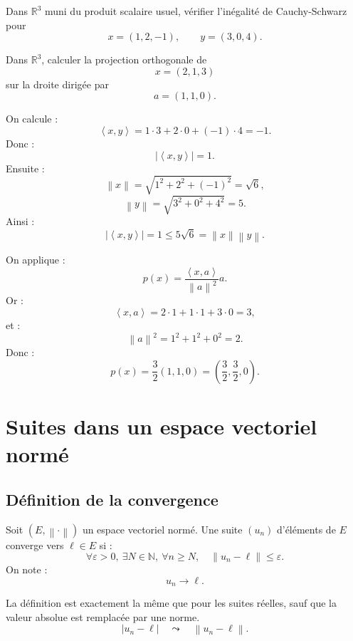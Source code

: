 \documentclass[11pt,a4paper]{article}
\newcommand{\R}{\mathbb R}
\newcommand{\N}{\mathbb N}
\newcommand{\norme}[1]{\left\lVert #1 \right\rVert}
\newcommand{\scal}[2]{\left\langle #1,#2\right\rangle}
\begin{document}
\begin{exercicebox}
Dans \(\R^3\) muni du produit scalaire usuel, vérifier l'inégalité de Cauchy-Schwarz pour
\[
x=(1,2,-1),\qquad y=(3,0,4).
\]
\end{exercicebox}

\begin{exercicebox}[5 -- Projection]
Dans \(\R^3\), calculer la projection orthogonale de
\[
x=(2,1,3)
\]
sur la droite dirigée par
\[
a=(1,1,0).
\]
\end{exercicebox}

\begin{correctionbox}[4]
On calcule :
\[
\scal{x}{y}=1\cdot3+2\cdot0+(-1)\cdot4=-1.
\]
Donc :
\[
|\scal{x}{y}|=1.
\]
Ensuite :
\[
\norme{x}=\sqrt{1^2+2^2+(-1)^2}=\sqrt6,
\]
\[
\norme{y}=\sqrt{3^2+0^2+4^2}=5.
\]
Ainsi :
\[
|\scal{x}{y}|=1\leq 5\sqrt6=\norme{x}\norme{y}.
\]
\end{correctionbox}

\begin{correctionbox}[5]
On applique :
\[
p(x)=\frac{\scal{x}{a}}{\norme{a}^2}a.
\]
Or :
\[
\scal{x}{a}=2\cdot1+1\cdot1+3\cdot0=3,
\]
et :
\[
\norme{a}^2=1^2+1^2+0^2=2.
\]
Donc :
\[
p(x)=\frac32(1,1,0)=\left(\frac32,\frac32,0\right).
\]
\end{correctionbox}

\section{Suites dans un espace vectoriel normé}

\subsection{Définition de la convergence}

\begin{definitionbox}
Soit \((E,\norme{\cdot})\) un espace vectoriel normé.  
Une suite \((u_n)\) d'éléments de \(E\) converge vers \(\ell\in E\) si :
\[
\forall \varepsilon>0,\ \exists N\in\N,\ \forall n\geq N,\quad \norme{u_n-\ell}\leq \varepsilon.
\]
On note :
\[
u_n\longrightarrow \ell.
\]
\end{definitionbox}

\begin{retenirbox}
La définition est exactement la même que pour les suites réelles, sauf que la valeur absolue est remplacée par une norme.
\[
|u_n-\ell|\quad \leadsto \quad \norme{u_n-\ell}.
\]
\end{retenirbox}
\end{document}
